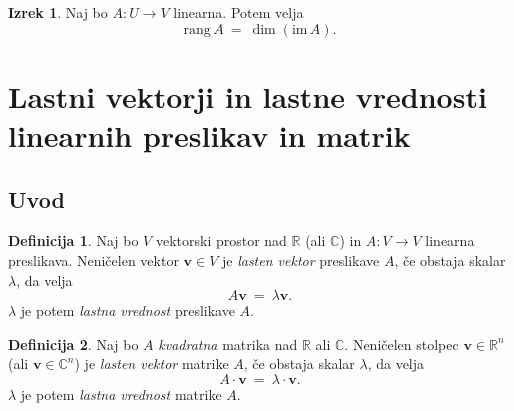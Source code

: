 \documentclass[11pt]{article}
\newcommand{\R}{\mathbb{R}}
\newcommand{\vv}{\mathbf{v}}
\newcommand{\0}{\mathbf{0}}
\newcommand{\rang}{\text{rang}\,}
\newcommand{\im}{\text{im}\,}
\theoremstyle{definition}
\newtheorem{definicija}{Definicija}[section]
\theoremstyle{definition}
\theoremstyle{definition}
\newtheorem{izrek}{Izrek}[section]
\theoremstyle{definition}
\begin{document}
\begin{izrek}

Naj bo $A: U \rightarrow V$ linearna. Potem velja
$$\rang A ~=~ \dim (\im A).$$

\end{izrek}
\vspace{0.5cm}


\pagebreak


\section{Lastni vektorji in lastne vrednosti \\linearnih preslikav in matrik}
\vspace{0.5cm}


\subsection{Uvod}
\vspace{0.5cm}

\begin{definicija}

Naj bo $V$ vektorski prostor nad $\R$ (ali $\mathbb{C}$) in $A: V \rightarrow V$ linearna preslikava. Neničelen vektor $\vv \in V$ je \textit{lasten vektor} preslikave $A$, če obstaja skalar $\lambda$, da velja
$$A\vv ~=~ \lambda\vv.$$
$\lambda$ je potem \textit{lastna vrednost} preslikave $A$.

\end{definicija}
\vspace{0.5cm}

\begin{definicija}

Naj bo $A$ \textit{kvadratna} matrika nad $\R$ ali $\mathbb{C}$. Neničelen stolpec $\vv \in \R^n$ (ali $\vv \in \mathbb{C}^n$) je \textit{lasten vektor} matrike $A$, če obstaja skalar $\lambda$, da velja
$$A \cdot \vv ~=~ \lambda \cdot \vv.$$
$\lambda$ je potem \textit{lastna vrednost} matrike $A$.

\end{definicija}
\vspace{0.5cm}
\end{document}
